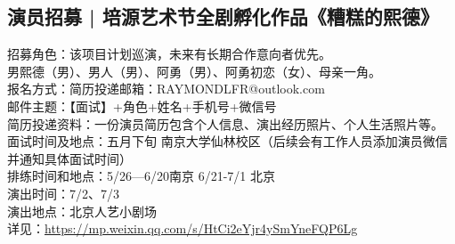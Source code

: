 \documentclass[letterpaper, 12pt]{article}
\begin{document}
\begin{multicols}{2}
\subsection{演员招募 | 培源艺术节全剧孵化作品《糟糕的熙德》} %
招募角色：该项目计划巡演，未来有长期合作意向者优先。
\\男熙德（男）、男人（男）、阿勇（男）、阿勇初恋（女）、母亲一角。
\\报名方式：简历投递邮箱：RAYMONDLFR@outlook.com
\\邮件主题：【面试】+角色+姓名+手机号+微信号
\\简历投递资料：一份演员简历包含个人信息、演出经历照片、个人生活照片等。
\\面试时间及地点：五月下旬 南京大学仙林校区（后续会有工作人员添加演员微信并通知具体面试时间）
\\排练时间和地点：5/26—6/20南京 6/21-7/1 北京
\\演出时间：7/2、7/3 
\\演出地点：北京人艺小剧场
\\详见：\url{https://mp.weixin.qq.com/s/HtCi2eYjr4ySmYneFQP6Lg}



\end{multicols}
\end{document}
